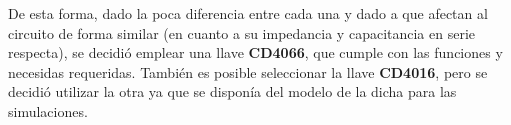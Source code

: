 De esta forma, dado la poca diferencia entre cada una y dado a que afectan al circuito de forma similar (en cuanto a su impedancia y capacitancia en serie respecta), se decidió emplear una llave \textbf{CD4066}, que cumple con las funciones y necesidas requeridas. También es posible seleccionar la llave \textbf{CD4016}, pero se decidió utilizar la otra ya que se disponía del modelo de la dicha para las simulaciones.
